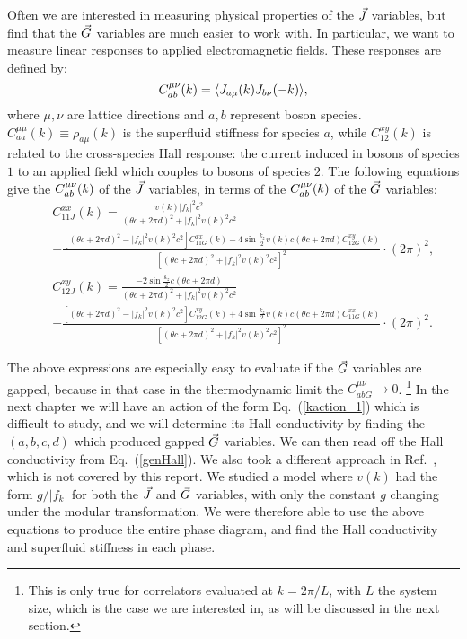 Often we are interested in measuring physical properties of the $\vec{J}$ variables, but find that the $\vec{G}$ variables are much easier to work with. In particular, we want to measure linear responses to applied electromagnetic fields. These responses are defined by:
\begin{equation}
C^{\mu\nu}_{ab}(k)=\langle J_{a\mu}(k) J_{b\nu}(-k)\rangle,
\end{equation}
where $\mu,\nu$ are lattice directions and $a,b$ represent boson species. $C^{\mu\mu}_{aa}(k)\equiv \rho_{a\mu}(k)$ is the superfluid stiffness for species $a$, while $C^{xy}_{12}(k)$ is related to the cross-species Hall response: the current induced in bosons of species $1$ to an applied field which couples to bosons of species $2$. The following equations give the $C^{\mu\nu}_{ab}(k)$ of the $\vec{J}$ variables, in terms of the $C^{\mu\nu}_{ab}(k)$ of the $\vec{G}$ variables:
\begin{eqnarray}
&&C_{11J}^{xx}(k)=\frac{v(k)|f_k|^2c^2}{(\theta c+2\pi d)^2+|f_k|^2v(k)^2c^2}\\
&&+\frac{[(\theta c+2\pi d)^2-|f_k|^2v(k)^2c^2]C_{11G}^{xx}(k)-4\sin{\frac{k_z}{2}}v(k)c(\theta c+2\pi d)C_{12G}^{xy}(k)}{[(\theta c+2\pi d)^2+|f_k|^2v(k)^2c^2]^2}\cdot (2\pi)^2,\nonumber\\
&&C_{12J}^{xy}(k)=\frac{-2\sin{\frac{k_z}{2}}c(\theta c+2\pi d)}{(\theta c+2\pi d)^2+|f_k|^2v(k)^2c^2}\label{genHall}\\
&&+\frac{[(\theta c+2\pi d)^2-|f_k|^2v(k)^2c^2]C_{12G}^{xy}(k)+4\sin{\frac{k_z}{2}}v(k)c(\theta c+2\pi d)C_{11G}^{xx}(k)}{[(\theta c+2\pi d)^2+|f_k|^2v(k)^2c^2]^2}\cdot (2\pi)^2.\nonumber
\end{eqnarray}

The above expressions are especially easy to evaluate if the $\vec{G}$ variables are gapped, because in that case in the thermodynamic limit the $C^{\mu\nu}_{abG}\rightarrow 0$.
\footnote{This is only true for correlators evaluated at $k=2\pi/L$, with $L$ the system size, which is the case we are interested in, as will be discussed in the next section.}
In the next chapter we will have an action of the form Eq.~(\ref{kaction_1}) which is difficult to study, and we will determine its Hall conductivity by finding the $(a,b,c,d)$ which produced gapped $\vec{G}$ variables. We can then read off the Hall conductivity from Eq.~(\ref{genHall}). We also took a different approach in Ref.~\cite{Gen2Loops}, which is not covered by this report. We studied a model where $v(k)$ had the form $g/|f_k|$ for both the $\vec{J}$ and $\vec{G}$ variables, with only the constant $g$ changing under the modular transformation. We were therefore able to use the above equations to produce the entire phase diagram, and find the Hall conductivity and superfluid stiffness in each phase.

